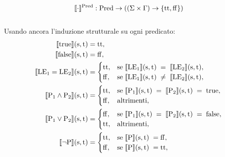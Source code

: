 \documentclass[a4paper, 12pt, oneside,fleqn]{book}
\begin{document}
$$\llbracket \cdot \rrbracket ^{\mathrm{Pred}}: \mathrm{Pred} \rightarrow ((\Sigma \times \Gamma) \rightarrow \{\mathrm{tt},\mathrm{ff} \})$$\\
Usando ancora l'induzione strutturale su ogni predicato:
\begin{align}
\llbracket \mathrm{true} \rrbracket(\mathrm{s},\mathrm{t}) &= \mathrm{tt}, \\
\llbracket \mathrm{false} \rrbracket(\mathrm{s},\mathrm{t}) &= \mathrm{ff}, \\
\llbracket \mathrm{LE}{_1} = \mathrm{LE}{_2}\rrbracket(\mathrm{s},\mathrm{t}) &= 
	\begin{cases}
   		\mathrm{tt}, &\text{se} \hspace{1mm}\llbracket\mathrm{LE}{_1}\rrbracket(\mathrm{s},\mathrm{t})\hspace{1mm} = \hspace{1mm}\llbracket 						\mathrm{LE}{_2} \rrbracket(\mathrm{s},\mathrm{t}),\\
   		\mathrm{ff}, &\text{se}\hspace{1mm}\llbracket\mathrm{LE}{_1}\rrbracket(\mathrm{s},\mathrm{t})\hspace{1mm}\neq\hspace{1mm}\llbracket 						\mathrm{LE}{_2}\rrbracket(\mathrm{s},\mathrm{t}),
	\end{cases} \\
\llbracket \mathrm{P}{_1} \wedge \mathrm{P}{_2}\rrbracket(\mathrm{s},\mathrm{t}) &=
	\begin{cases}
   		\mathrm{tt}, &\text{se}\hspace{1mm}\llbracket \mathrm{P}{_1}\rrbracket(\mathrm{s},\mathrm{t})\hspace{1mm} = \hspace{1mm}\llbracket 						\mathrm{P}{_2}\rrbracket(\mathrm{s},\mathrm{t})\hspace{1mm} = \hspace{1mm}\mathrm{true},\\
   		\mathrm{ff}, &\text{altrimenti},
 	\end{cases} \\
\llbracket \mathrm{P}{_1} \vee \mathrm{P}{_2}\rrbracket(\mathrm{s},\mathrm{t}) &=
	\begin{cases}
   		\mathrm{ff}, &\text{se} \hspace{1mm}\llbracket \mathrm{P}{_1}\rrbracket(\mathrm{s},\mathrm{t})\hspace{1mm} = \hspace{1mm}\llbracket 						\mathrm{P}{_2}\rrbracket(\mathrm{s},\mathrm{t})\hspace{1mm} = \hspace{1mm}\mathrm{false},   \\
   		\mathrm{tt},  &\text{altrimenti},
	\end{cases} \\
\llbracket \neg \mathrm{P}\rrbracket(\mathrm{s},\mathrm{t}) &= 
	\begin{cases}
   		\mathrm{tt},&\text{se}\hspace{1mm}\llbracket \mathrm{P}\rrbracket(\mathrm{s},\mathrm{t})\hspace{1mm} = \mathrm{ff},\\
   		\mathrm{ff},&\text{se}\hspace{1mm} \llbracket \mathrm{P}\rrbracket(\mathrm{s},\mathrm{t})\hspace{1mm} = \mathrm{tt},
   	\end{cases}
\end{align}
\end{document}
